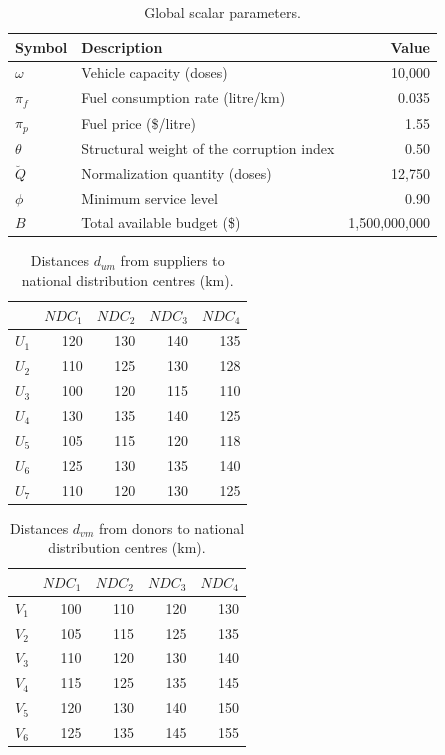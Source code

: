 \documentclass[a4paper]{elsarticle}
\begin{document}
{%
\begin{table}[htbp]
\centering
\caption{Global scalar parameters.}
\label{tab:A2}
\begin{tabular}{llr}
\toprule
Symbol & Description & Value \\
\midrule
$\omega$ & Vehicle capacity (doses) & 10,000 \\
$\pi_f$ & Fuel consumption rate (litre/km) & 0.035 \\
$\pi_p$ & Fuel price (\$/litre) & 1.55 \\
$\theta$ & Structural weight of the corruption index & 0.50 \\
$\breve{Q}$ & Normalization quantity (doses) & 12,750 \\
$\phi$ & Minimum service level & 0.90 \\
$B$ & Total available budget (\$) & 1,500,000,000 \\
\bottomrule
\end{tabular}
\end{table}

\begin{table}[htbp]
\centering
\caption{Distances $d_{um}$ from suppliers to national distribution centres (km).}
\label{tab:A6}
\begin{tabular}{lrrrr}
\toprule
 & $NDC_1$ & $NDC_2$ & $NDC_3$ & $NDC_4$ \\
\midrule
$U_1$ & 120 & 130 & 140 & 135 \\
$U_2$ & 110 & 125 & 130 & 128 \\
$U_3$ & 100 & 120 & 115 & 110 \\
$U_4$ & 130 & 135 & 140 & 125 \\
$U_5$ & 105 & 115 & 120 & 118 \\
$U_6$ & 125 & 130 & 135 & 140 \\
$U_7$ & 110 & 120 & 130 & 125 \\
\bottomrule
\end{tabular}
\end{table}

\begin{table}[htbp]
\centering
\caption{Distances $d_{vm}$ from donors to national distribution centres (km).}
\label{tab:A7}
\begin{tabular}{lrrrr}
\toprule
 & $NDC_1$ & $NDC_2$ & $NDC_3$ & $NDC_4$ \\
\midrule
$V_1$ & 100 & 110 & 120 & 130 \\
$V_2$ & 105 & 115 & 125 & 135 \\
$V_3$ & 110 & 120 & 130 & 140 \\
$V_4$ & 115 & 125 & 135 & 145 \\
$V_5$ & 120 & 130 & 140 & 150 \\
$V_6$ & 125 & 135 & 145 & 155 \\
\bottomrule
\end{tabular}
\end{table}

}
\end{document}
